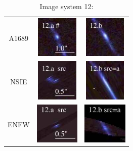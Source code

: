 \documentclass[useAMS,usenatbib]{mn2e}
\begin{document}
\begin{table}
  \caption{Image system 12:}\vspace{0mm}
  \begin{tabular}{ccc}
    \multicolumn{1}{m{1cm}}{{\Large A1689}}
    & \multicolumn{1}{m{1.7cm}}{\includegraphics[height=2.00cm,clip]{figs/nsie_img/rgb.img_12_a.ps}}
    & \multicolumn{1}{m{1.7cm}}{\includegraphics[height=2.00cm,clip]{figs/nsie_img/rgb.img_12_b.ps}} \\
    \multicolumn{1}{m{1cm}}{{\Large NSIE}}
    & \multicolumn{1}{m{1.7cm}}{\includegraphics[height=2.00cm,clip]{figs/nsie_img/rgb.src_12_a.ps}}
    & \multicolumn{1}{m{1.7cm}}{\includegraphics[height=2.00cm,clip]{figs/nsie_img/rgb.pre_12_b_a_tri.ps}} \\
    \multicolumn{1}{m{1cm}}{{\Large ENFW}}
    & \multicolumn{1}{m{1.7cm}}{\includegraphics[height=2.00cm,clip]{figs/enfw_img/rgb.src_12_a.ps}}
    & \multicolumn{1}{m{1.7cm}}{\includegraphics[height=2.00cm,clip]{figs/enfw_img/rgb.pre_12_b_a_tri.ps}} \\
  \end{tabular}

\end{table}
\end{document}
